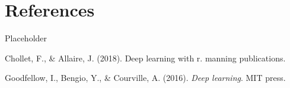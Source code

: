 \documentclass[12pt,twoside]{reedthesis}
\begin{document}
\chapter*{References}\label{references}

Placeholder

\hypertarget{refs}{}
\hypertarget{ref-chollet2018deep}{}
Chollet, F., \& Allaire, J. (2018). Deep learning with r. manning
publications.

\hypertarget{ref-goodfellow2016deep}{}
Goodfellow, I., Bengio, Y., \& Courville, A. (2016). \emph{Deep
learning}. MIT press.


\end{document}
